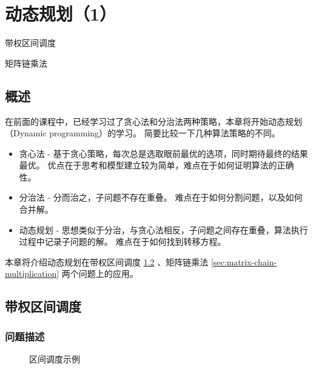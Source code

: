 \chapter{动态规划（1）}

\begin{introduction}
  \item 带权区间调度
  \item 矩阵链乘法
\end{introduction}

\section{概述}
在前面的课程中，已经学习过了贪心法和分治法两种策略，本章将开始动态规划（Dynamic programming）的学习。
简要比较一下几种算法策略的不同。

\begin{itemize}
  \item 贪心法 - 基于贪心策略，每次总是选取眼前最优的选项，同时期待最终的结果最优。
        优点在于思考和模型建立较为简单，难点在于如何证明算法的正确性。
  \item 分治法 - 分而治之，子问题不存在重叠。
        难点在于如何分割问题，以及如何合并解。
  \item 动态规划 - 思想类似于分治，与贪心法相反，子问题之间存在重叠，算法执行过程中记录子问题的解。
        难点在于如何找到转移方程。
\end{itemize}

本章将介绍动态规划在带权区间调度 \ref{sec:weighted-interval-scheduling} 、矩阵链乘法 \ref{sec:matrix-chain-multiplication} 两个问题上的应用。

\section{带权区间调度} \label{sec:weighted-interval-scheduling}

\subsection{问题描述}

\begin{figure}[hbt!]
  \centering
  \caption{区间调度示例}
  \label{fig:wis-picture-1}
\end{figure}


